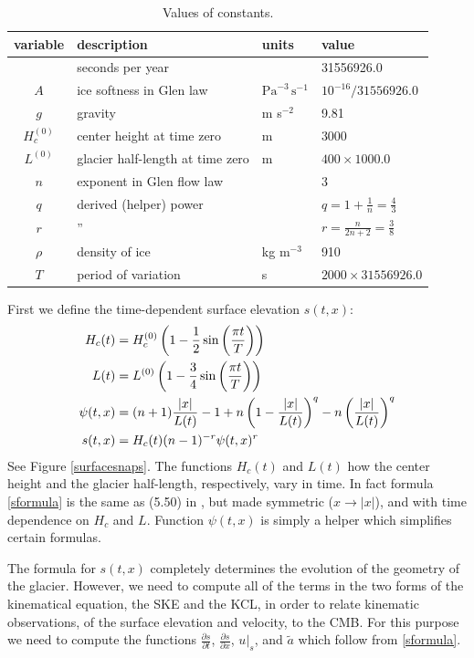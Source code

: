 \documentclass[letterpaper,final,12pt,reqno]{amsart}
\begin{document}
\begin{table}
\begin{tabular}{clll}
variable  & description & units & value \\
\hline
    & seconds per year &  & 31556926.0 \\
$A$ & ice softness in Glen law & $\text{Pa}^{-3}\,\text{s}^{-1}$ & $10^{-16}/31556926.0$ \\
$g$ & gravity & m s$^{-2}$ & 9.81 \\
$H_c^{(0)}$ & center height at time zero & m & 3000 \\
$L^{(0)}$ & glacier half-length at time zero & m & $400 \times 1000.0$ \\
$n$ & exponent in Glen flow law & & 3 \\
$q$ & derived (helper) power & & $q = 1+\frac{1}{n} = \frac{4}{3}$ \\
$r$ & \qquad '' & & $r = \frac{n}{2n+2} = \frac{3}{8}$ \\
$\rho$ & density of ice & kg m$^{-3}$ & 910 \\
$T$ & period of variation & s & $2000 \times 31556926.0$
\end{tabular}
\caption{Values of constants.}
\label{constantstable}
\end{table}

First we define the time-dependent surface elevation $s(t,x)$:
\begin{align}
H_c(t) &= H_c^{(0)} \left(1 - \frac{1}{2} \sin\left(\frac{\pi t}{T}\right)\right) \notag \\
L(t) &= L^{(0)} \left(1 - \frac{3}{4} \sin\left(\frac{\pi t}{T}\right)\right) \notag\\
\psi(t,x) &= (n+1) \frac{|x|}{L(t)} - 1 + n \left(1 - \frac{|x|}{L(t)}\right)^q - n \left(\frac{|x|}{L(t)}\right)^q \notag \\
s(t,x) &= H_c(t) (n-1)^{-r} \psi(t,x)^r \label{sformula}
\end{align}
See Figure \ref{surfacesnaps}.  The functions $H_c(t)$ and $L(t)$ how the center height and the glacier half-length, respectively, vary in time.  In fact formula \eqref{sformula} is the same as (5.50) in \cite{vanderVeen2013}, but made symmetric ($x \to |x|$), and with time dependence on $H_c$ and $L$.  Function $\psi(t,x)$ is simply a helper which simplifies certain formulas.

The formula for $s(t,x)$ completely determines the evolution of the geometry of the glacier.  However, we need to compute all of the terms in the two forms of the kinematical equation, the SKE and the KCL, in order to relate kinematic observations, of the surface elevation and velocity, to the CMB.  For this purpose we need to compute the functions $\frac{\partial s}{\partial t}$, $\frac{\partial s}{\partial x}$, $u|_s$, and $\tilde a$ which follow from \eqref{sformula}.
\end{document}
